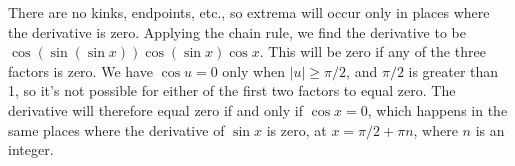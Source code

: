 There are no kinks, endpoints, etc., so
extrema will occur only in places where the derivative is zero.
Applying the chain rule, we find the derivative to be $\cos(\sin(\sin x))\cos(\sin x)\cos x$.
This will be zero if any of the three factors is zero. We have $\cos u=0$ only when $|u| \ge \pi/2$,
and $\pi/2$ is greater than 1, so it's not possible for either of the first two factors to equal zero.
The derivative will therefore equal zero if and only if $\cos x=0$, which happens in the same places
where the derivative of $\sin x$ is zero, at $x=\pi/2+\pi n$, where $n$ is an integer.

